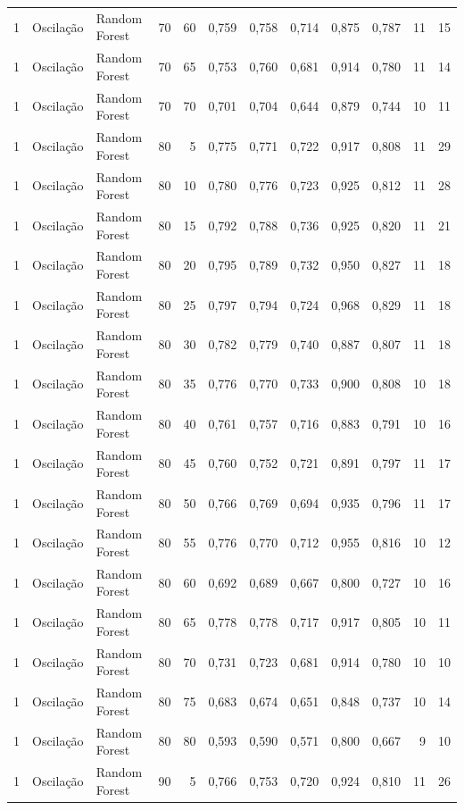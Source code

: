 \begin{longtable}{@{}rllrrrrrrrrr@{}}
1 & Oscilação & Random Forest & 70 & 60 & 0,759 & 0,758 & 0,714 & 0,875 & 0,787 & 11 & 15 \\
1 & Oscilação & Random Forest & 70 & 65 & 0,753 & 0,760 & 0,681 & 0,914 & 0,780 & 11 & 14 \\
1 & Oscilação & Random Forest & 70 & 70 & 0,701 & 0,704 & 0,644 & 0,879 & 0,744 & 10 & 11 \\
1 & Oscilação & Random Forest & 80 & 5 & 0,775 & 0,771 & 0,722 & 0,917 & 0,808 & 11 & 29 \\
1 & Oscilação & Random Forest & 80 & 10 & 0,780 & 0,776 & 0,723 & 0,925 & 0,812 & 11 & 28 \\
1 & Oscilação & Random Forest & 80 & 15 & 0,792 & 0,788 & 0,736 & 0,925 & 0,820 & 11 & 21 \\
1 & Oscilação & Random Forest & 80 & 20 & 0,795 & 0,789 & 0,732 & 0,950 & 0,827 & 11 & 18 \\
1 & Oscilação & Random Forest & 80 & 25 & 0,797 & 0,794 & 0,724 & 0,968 & 0,829 & 11 & 18 \\
1 & Oscilação & Random Forest & 80 & 30 & 0,782 & 0,779 & 0,740 & 0,887 & 0,807 & 11 & 18 \\
1 & Oscilação & Random Forest & 80 & 35 & 0,776 & 0,770 & 0,733 & 0,900 & 0,808 & 10 & 18 \\
1 & Oscilação & Random Forest & 80 & 40 & 0,761 & 0,757 & 0,716 & 0,883 & 0,791 & 10 & 16 \\
1 & Oscilação & Random Forest & 80 & 45 & 0,760 & 0,752 & 0,721 & 0,891 & 0,797 & 11 & 17 \\
1 & Oscilação & Random Forest & 80 & 50 & 0,766 & 0,769 & 0,694 & 0,935 & 0,796 & 11 & 17 \\
1 & Oscilação & Random Forest & 80 & 55 & 0,776 & 0,770 & 0,712 & 0,955 & 0,816 & 10 & 12 \\
1 & Oscilação & Random Forest & 80 & 60 & 0,692 & 0,689 & 0,667 & 0,800 & 0,727 & 10 & 16 \\
1 & Oscilação & Random Forest & 80 & 65 & 0,778 & 0,778 & 0,717 & 0,917 & 0,805 & 10 & 11 \\
1 & Oscilação & Random Forest & 80 & 70 & 0,731 & 0,723 & 0,681 & 0,914 & 0,780 & 10 & 10 \\
1 & Oscilação & Random Forest & 80 & 75 & 0,683 & 0,674 & 0,651 & 0,848 & 0,737 & 10 & 14 \\
1 & Oscilação & Random Forest & 80 & 80 & 0,593 & 0,590 & 0,571 & 0,800 & 0,667 & 9 & 10 \\
1 & Oscilação & Random Forest & 90 & 5 & 0,766 & 0,753 & 0,720 & 0,924 & 0,810 & 11 & 26 \\

\end{longtable}

